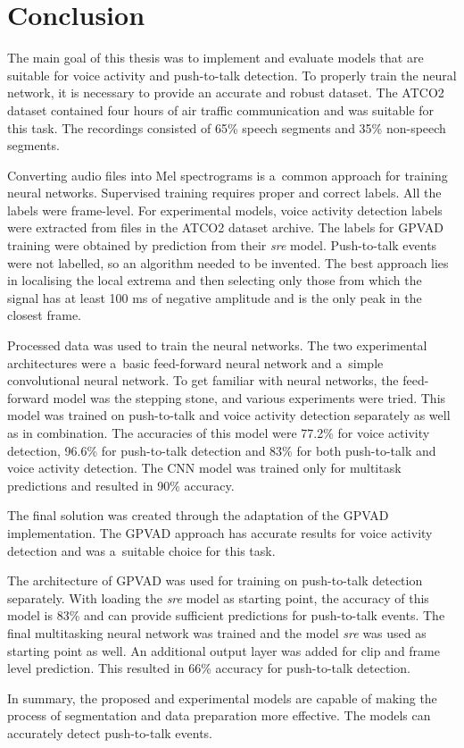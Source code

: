 \chapter{Conclusion}\label{Conclusion}

    The main goal of this thesis was to implement and evaluate models that are suitable for voice activity and push-to-talk detection. 
    To properly train the neural network, it is necessary to provide an accurate and robust dataset. The ATCO2 dataset contained four hours of air traffic communication and was suitable for this task. The recordings consisted of 65\% speech segments and 35\% non-speech segments. 
    
    Converting audio files into Mel spectrograms is a~common approach for training neural networks. Supervised training requires proper and correct labels. All the labels were frame-level. For experimental models, voice activity detection labels were extracted from files in the ATCO2 dataset archive. The labels for GPVAD training were obtained by prediction from their \textit{sre} model. Push-to-talk events were not labelled, so an algorithm needed to be invented. The best approach lies in localising the local extrema and then selecting only those from which the signal has at least 100 ms of negative amplitude and is the only peak in the closest frame.
    
    Processed data was used to train the neural networks. The two experimental architectures were a~basic feed-forward neural network and a~simple convolutional neural network. To get familiar with neural networks, the feed-forward model was the stepping stone, and various experiments were tried. This model was trained on push-to-talk and voice activity detection separately as well as in combination. The accuracies of this model were 77.2\% for voice activity detection, 96.6\% for push-to-talk detection and 83\% for both push-to-talk and voice activity detection. The CNN model was trained only for multitask predictions and resulted in 90\% accuracy. 
    
    The final solution was created through the adaptation of the GPVAD implementation. The GPVAD approach has accurate results for voice activity detection and was a~suitable choice for this task. 
    
    The architecture of GPVAD was used for training on push-to-talk detection separately. With loading the \textit{sre} model as starting point, the accuracy of this model is 83\% and can provide sufficient predictions for push-to-talk events. The final multitasking neural network was trained and the model \textit{sre} was used as starting point as well. An additional output layer was added for clip and frame level prediction. This resulted in 66\% accuracy for push-to-talk detection. 

    In summary, the proposed and experimental models are capable of making the process of segmentation and data preparation more effective. The models can accurately detect push-to-talk events.


    

% 